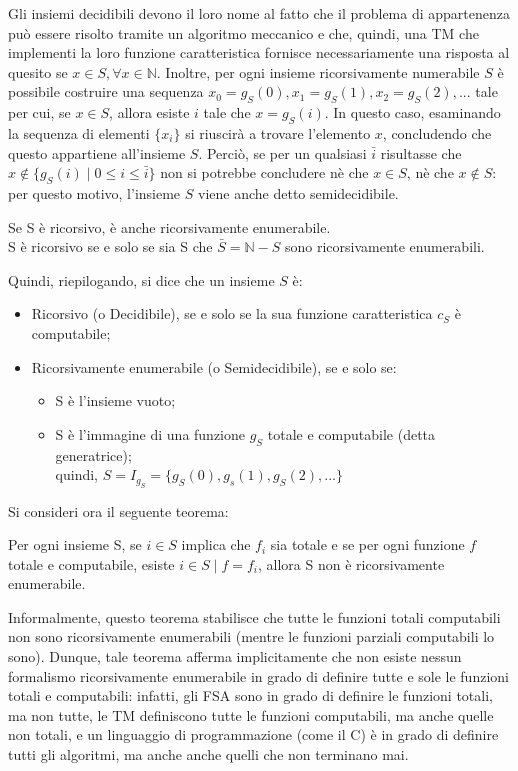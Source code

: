   Gli insiemi decidibili devono il loro nome al fatto che il problema di appartenenza può essere risolto tramite un algoritmo meccanico e che, quindi, una TM che implementi la loro funzione caratteristica fornisce necessariamente una risposta al quesito se \(x\in S, \forall x \in \mathbb{N} \). Inoltre, per ogni insieme ricorsivamente numerabile \(S\) è possibile costruire una sequenza \(x_0=g_S(0), x_1=g_S(1), x_2=g_S(2),...\) tale per cui, se \(x\in S\), allora esiste \(i\) tale che \(x=g_S(i)\). In questo caso, esaminando la sequenza di elementi \(\{x_i\}\) si riuscirà a trovare l'elemento \(x\), concludendo che questo appartiene all'insieme \(S\). Perciò, se per un qualsiasi \(\bar{i}\) risultasse che \(x\notin\{g_S(i)\;|\;0\le i \le \bar{i}\}\) non si potrebbe concludere nè che \(x\in S\), nè che \(x\notin S\): per questo motivo, l'insieme \(S\) viene anche detto semidecidibile.

  \begin{theorem}
    Se S è ricorsivo, è anche ricorsivamente enumerabile. \\
    S è ricorsivo se e solo se sia S che \(\bar{S}=\mathbb{N}-S\) sono ricorsivamente enumerabili.
  \end{theorem}

  Quindi, riepilogando, si dice che un insieme \(S\) è:
  \begin{itemize}
    \item Ricorsivo (o Decidibile), se e solo se la sua funzione caratteristica \(c_S\) è computabile;
    \item Ricorsivamente enumerabile (o Semidecidibile), se e solo se:
    \begin{itemize}
      \item S è l'insieme vuoto;
      \item S è l'immagine di una funzione \(g_S\) totale e computabile (detta generatrice); \\ quindi, \(S=I_{g_S}=\{g_S(0), g_s(1), g_S(2),...\}\)
    \end{itemize}
  \end{itemize}

  Si consideri ora il seguente teorema:
  \begin{theorem}
    Per ogni insieme S, se \(i \in S\) implica che \(f_i\) sia totale e se per ogni funzione \(f\) totale e computabile, esiste \(i\in S\;|\;f=f_i\), allora S non è ricorsivamente enumerabile. 
  \end{theorem}

  Informalmente, questo teorema stabilisce che tutte le funzioni totali computabili non sono ricorsivamente enumerabili (mentre le funzioni parziali computabili lo sono). Dunque, tale teorema afferma implicitamente che non esiste nessun formalismo ricorsivamente enumerabile in grado di definire tutte e sole le funzioni totali e computabili: infatti, gli FSA sono in grado di definire le funzioni totali, ma non tutte, le TM definiscono tutte le funzioni computabili, ma anche quelle non totali, e un linguaggio di programmazione (come il C) è in grado di definire tutti gli algoritmi, ma anche anche quelli che non terminano mai. 
  
